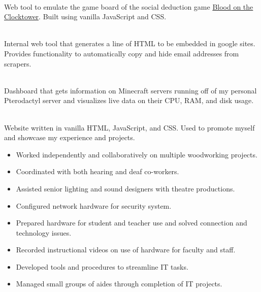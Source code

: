 \documentclass[10pt,a4paper,ragged2e,withhyper]{altacv}
\begin{document}

 \\\smallskip
Web tool to emulate the game board of the social deduction game \href{https://bloodontheclocktower.com/}{Blood on the Clocktower}. Built using vanilla JavaScript and CSS.

\divider

\\\smallskip
Internal web tool that generates a line of HTML to be embedded in
google sites. Provides functionality to automatically copy and hide email
addresses from scrapers.

\divider

 \\\smallskip
Dashboard that gets information on Minecraft servers running off
of my personal Pterodactyl  server and visualizes live data on their
CPU, RAM, and disk usage.

\divider

 \\\smallskip
Website written in vanilla HTML, JavaScript, and CSS.
Used to promote myself and showcase my experience
and projects.



\smallskip
{}

\begin{itemize}
\item Worked independently and collaboratively on multiple woodworking projects.
\item Coordinated with both hearing and deaf co-workers.
\item Assisted senior lighting and sound designers with theatre productions.
\end{itemize}

\divider

\begin{itemize}
\item Configured network hardware for security system.
\item Prepared hardware for student and teacher use and solved connection and technology issues.
\item Recorded instructional videos on use of hardware for faculty and staff.
\item Developed tools and procedures to streamline IT tasks.
\item Managed small groups of aides through completion of IT projects.
\end{itemize}
\end{document}
